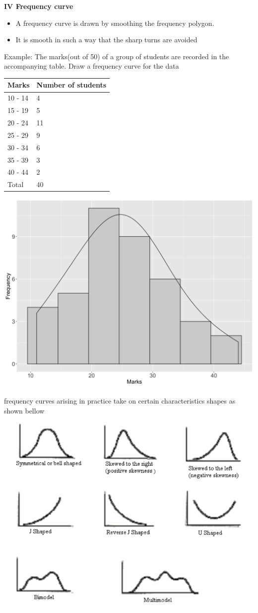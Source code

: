 \documentclass[]{book}
\providecommand{\tightlist}{%
  \setlength{\itemsep}{0pt}\setlength{\parskip}{0pt}}
\begin{document}
\textbf{IV Frequency curve}

\begin{itemize}
\tightlist
\item
  A frequency curve is drawn by smoothing the frequency polygon.
\item
  It is smooth in such a way that the sharp turns are avoided
\end{itemize}

Example: The marks(out of 50) of a group of students are recorded in the accompanying table. Draw a frequency curve for the data

\begin{longtable}[]{@{}ll@{}}
\toprule
Marks & Number of students\tabularnewline
\midrule
\endhead
10 - 14 & 4\tabularnewline
15 - 19 & 5\tabularnewline
20 - 24 & 11\tabularnewline
25 - 29 & 9\tabularnewline
30 - 34 & 6\tabularnewline
35 - 39 & 3\tabularnewline
40 - 44 & 2\tabularnewline
Total & 40\tabularnewline
\bottomrule
\end{longtable}

\begin{center}\includegraphics[width=0.8\linewidth]{figure/hist3-1} \end{center}

frequency curves arising in practice take on certain characteristics shapes as shown bellow

\begin{center}\includegraphics[width=1\linewidth]{figure/shapes} \end{center}
\end{document}
